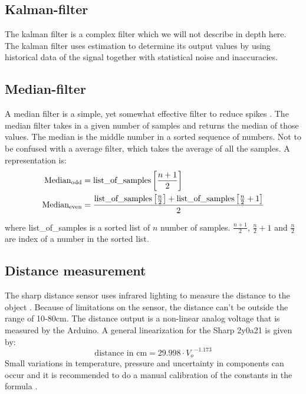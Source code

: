 \subsection{Kalman-filter}
The kalman filter is a complex filter which we will not describe in depth here. The kalman filter uses estimation to determine its output values by using historical data of the signal together with statistical noise and inaccuracies. 
\cite{Kalman-filter}


\subsection{Median-filter}
A median filter is a simple, yet somewhat effective filter to reduce spikes \cite{Median-library}. The median filter takes in a given number of samples and returns the median of those values. The median is the middle number in a sorted sequence of numbers. Not to be confused with a average filter, which takes the average of all the samples.
A representation is:\\


\begin{align*}
    \text{Median\textsubscript{odd}} &= \text{list\_of\_samples} \left[ \frac{n+1}{2} \right]\\
    \text{Median\textsubscript{even}} &= \frac{\text{list\_of\_samples} \left[ \frac{n}{2} \right] + \text{list\_of\_samples} \left[ \frac{n}{2} + 1 \right]}{2} 
\end{align*}

where list\_of\_samples is a sorted list of $n$ number of samples. $\frac{n+1}{2}$, $\frac{n}{2} + 1$ and $\frac{n}{2}$ are index of a number in the sorted list.


\subsection{Distance measurement}
The sharp distance sensor uses infrared lighting to measure the distance to the object \cite{Sharp-datasheet}. Because of limitations on the sensor, the distance can't be outside the range of 10-80cm. The distance output is a non-linear analog voltage that is measured by the Arduino. A general linearization for the Sharp 2y0a21 is given by:
\begin{equation}
    \label{eq:sharp-linear}
    \textrm{distance in cm} = 29.998 \cdot {V_o}^{-1.173}
\end{equation}
Small variations in temperature, pressure and uncertainty in components can occur and it is recommended to do a manual calibration of the constants in the formula \cite{Sharp-datasheet}.

